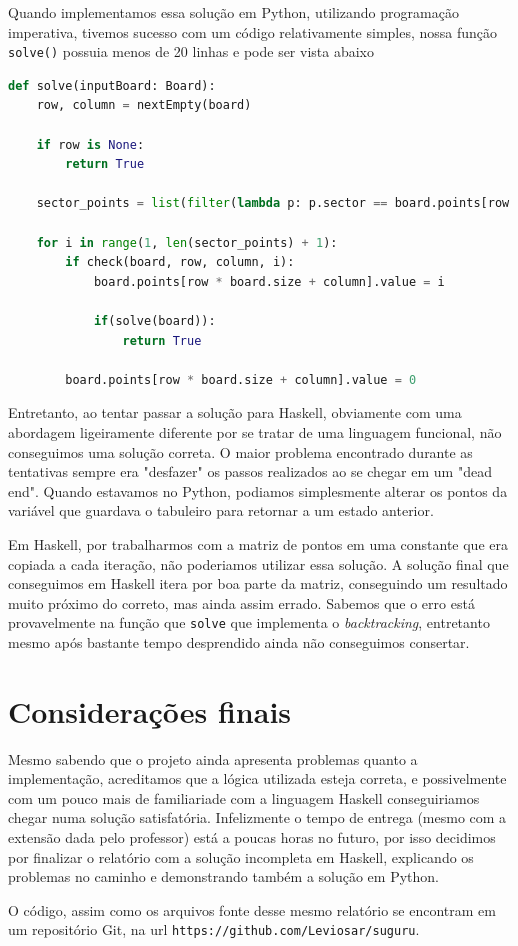 \documentclass[12pt]{article}
\begin{document}
Quando implementamos essa solução em Python, utilizando programação imperativa, tivemos sucesso com um código relativamente simples, nossa função \texttt{solve()} possuia menos de 20 linhas e pode ser vista abaixo

\begin{lstlisting}[language=Python]
def solve(inputBoard: Board):
    row, column = nextEmpty(board)

    if row is None:
        return True

    sector_points = list(filter(lambda p: p.sector == board.points[row * board.size + column].sector, board.points))

    for i in range(1, len(sector_points) + 1):
        if check(board, row, column, i):
            board.points[row * board.size + column].value = i
        
            if(solve(board)):
                return True

        board.points[row * board.size + column].value = 0
\end{lstlisting}

Entretanto, ao tentar passar a solução para Haskell, obviamente com uma abordagem ligeiramente diferente por se tratar de uma linguagem funcional, não conseguimos uma solução correta. O maior problema encontrado durante as tentativas sempre era "desfazer" os passos realizados ao se chegar em um "dead end". Quando estavamos no Python, podiamos simplesmente alterar os pontos da variável que guardava o tabuleiro para retornar a um estado anterior. 

Em Haskell, por trabalharmos com a matriz de pontos em uma constante que era copiada a cada iteração, não poderiamos utilizar essa solução. A solução final que conseguimos em Haskell itera por boa parte da matriz, conseguindo um resultado muito próximo do correto, mas ainda assim errado. Sabemos que o erro está provavelmente na função que \texttt{solve} que implementa o \emph{backtracking}, entretanto mesmo após bastante tempo desprendido ainda não conseguimos consertar.

\section{Considerações finais}

Mesmo sabendo que o projeto ainda apresenta problemas quanto a implementação, acreditamos que a lógica utilizada esteja correta, e possivelmente com um pouco mais de familiariade com a linguagem Haskell conseguiriamos chegar numa solução satisfatória. Infelizmente o tempo de entrega (mesmo com a extensão dada pelo professor) está a poucas horas no futuro, por isso decidimos por finalizar o relatório com a solução incompleta em Haskell, explicando os problemas no caminho e demonstrando também a solução em Python.

O código, assim como os arquivos fonte desse mesmo relatório se encontram em um repositório Git, na url \texttt{https://github.com/Leviosar/suguru}.

\medskip
\end{document}
